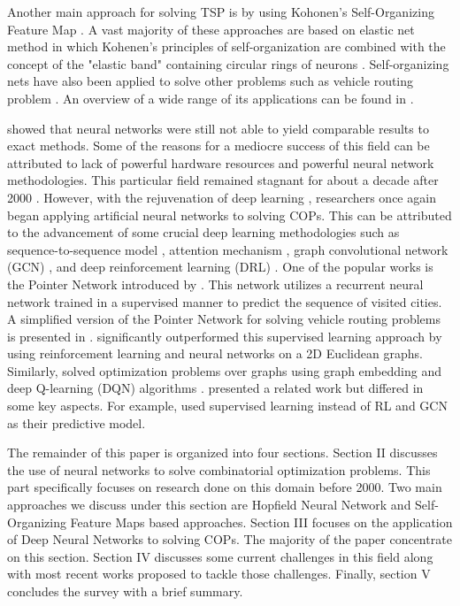 \documentclass{article}
\begin{document}
Another main approach for solving TSP is by using Kohonen's Self-Organizing Feature Map \cite{kohonen1982self}. A vast majority of these approaches are based on elastic net method \cite{durbin1987analogue} in which Kohenen's principles of self-organization are combined with the concept of the "elastic band" containing circular rings of neurons \cite{durbin1987analogue, smith1999neural}. Self-organizing nets have also been applied to solve other problems such as vehicle routing problem \cite{vakhutinsky1994solving}. An overview of a wide range of its applications can be found in \cite{kohonen1990self}. 

\cite{sarwar2012critical} showed that neural networks were still not able to yield comparable results to exact methods. Some of the reasons for a mediocre success of this field can be attributed to lack of powerful hardware resources and powerful neural network methodologies. This particular field remained stagnant for about a decade after 2000 \cite{bello2016neural}. However, with the rejuvenation of deep learning \cite{lecun2015deep}, researchers once again began applying artificial neural networks to solving COPs. This can be attributed to the advancement of some crucial deep learning methodologies such as sequence-to-sequence model \cite{sutskever2014sequence}, attention mechanism \cite{bahdanau2014neural}, graph convolutional network (GCN) \cite{kipf2016semi}, and deep reinforcement learning (DRL) \cite{mnih2015human}. One of the popular works is the Pointer Network introduced by \cite{vinyals2015pointer}. This network utilizes a recurrent neural network trained in a supervised manner to predict the sequence of visited cities. A simplified version of the Pointer Network for solving vehicle routing problems is presented in \cite{nazari2018reinforcement}. \cite{bello2016neural} significantly outperformed this supervised learning approach by using reinforcement learning and neural networks on a 2D Euclidean graphs. Similarly, \cite{khalil2017learning} solved optimization problems over graphs using graph embedding and deep Q-learning (DQN) algorithms \cite{mnih2015human}. \cite{li2018combinatorial} presented a related work but differed in some key aspects. For example, \cite{li2018combinatorial} used supervised learning instead of RL and GCN as their predictive model.   

The remainder of this paper is organized into four sections. Section II discusses the use of neural networks to solve combinatorial optimization problems. This part specifically focuses on research done on this domain before 2000. Two main approaches we discuss under this section are Hopfield Neural Network and Self-Organizing Feature Maps based approaches. 
Section III focuses on the application of Deep Neural Networks to solving COPs. The majority of the paper concentrate on this section. Section IV discusses some current challenges in this field along with most recent works proposed to tackle those challenges. Finally, section V concludes the survey with a brief summary.
\end{document}
